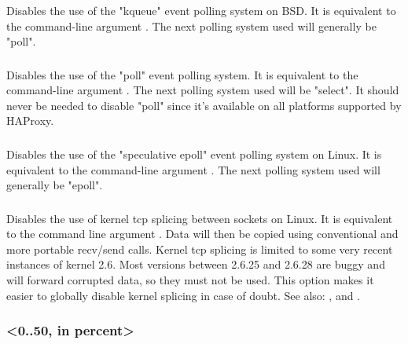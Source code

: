 \subsubsection[nokqueue]{}

Disables the use of the "kqueue" event polling system on BSD. It is
equivalent to the command-line argument . The next polling system
used will generally be "poll".


\subsubsection[nopoll]{}

Disables the use of the "poll" event polling system. It is equivalent to the
command-line argument . The next polling system used will be "select".
It should never be needed to disable "poll" since it's available on all
platforms supported by HAProxy.


\subsubsection[nosepoll]{}

Disables the use of the "speculative epoll" event polling system on Linux. It
is equivalent to the command-line argument . The next polling system
used will generally be "epoll".


\subsubsection[nosplice]{}

Disables the use of kernel tcp splicing between sockets on Linux. It is
equivalent to the command line argument .  Data will then be copied
using conventional and more portable recv/send calls. Kernel tcp splicing is
limited to some very recent instances of kernel 2.6. Most versions between
2.6.25 and 2.6.28 are buggy and will forward corrupted data, so they must not
be used. This option makes it easier to globally disable kernel splicing in
case of doubt.
See also: ,  and
.

\subsubsection[spread-checks]{ <0..50, in percent>}

